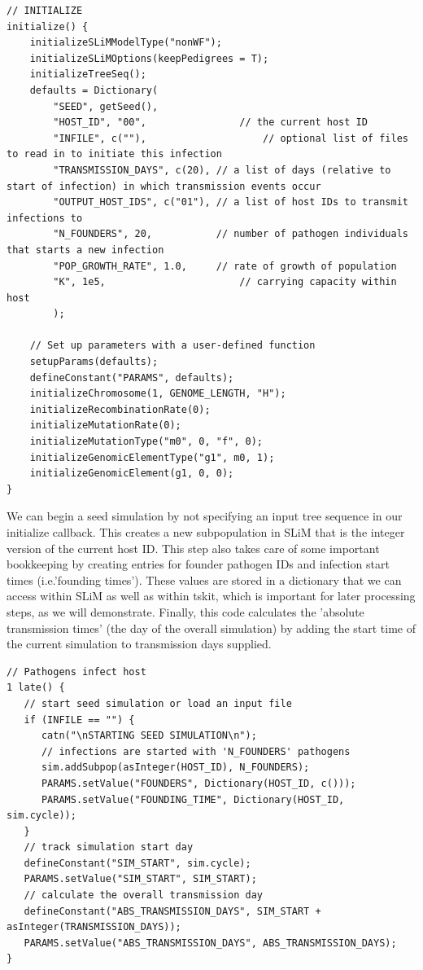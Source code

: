 \documentclass[12pt]{article}
\newcommand*{\ie}{i.e.\xcomma}
\begin{document}
\begin{verbatim}
// INITIALIZE
initialize() {
	initializeSLiMModelType("nonWF");
	initializeSLiMOptions(keepPedigrees = T);
	initializeTreeSeq();
	defaults = Dictionary(
		"SEED", getSeed(),
		"HOST_ID", "00", 				// the current host ID
		"INFILE", c(""),					// optional list of files to read in to initiate this infection
		"TRANSMISSION_DAYS", c(20),	// a list of days (relative to start of infection) in which transmission events occur
		"OUTPUT_HOST_IDS", c("01"),	// a list of host IDs to transmit infections to
		"N_FOUNDERS", 20,			// number of pathogen individuals that starts a new infection
		"POP_GROWTH_RATE", 1.0,		// rate of growth of population
		"K", 1e5,						// carrying capacity within host
		);
	
	// Set up parameters with a user-defined function
	setupParams(defaults);
	defineConstant("PARAMS", defaults);
	initializeChromosome(1, GENOME_LENGTH, "H");
	initializeRecombinationRate(0);
	initializeMutationRate(0);
	initializeMutationType("m0", 0, "f", 0);
	initializeGenomicElementType("g1", m0, 1);
	initializeGenomicElement(g1, 0, 0);
}
\end{verbatim}

We can begin a seed simulation by not specifying an input tree sequence in our initialize callback. This creates a new subpopulation in SLiM that is the integer version of the
current host ID. This step also takes care of some important bookkeeping by creating entries for founder pathogen IDs and infection start times (\ie 'founding times'). These
values are stored in a dictionary that we can access within SLiM as well as within tskit, which is important for later processing steps, as we will demonstrate. Finally, this code
calculates the 'absolute transmission times' (the day of the overall simulation) by adding the start time of the current simulation to transmission days supplied.

\begin{verbatim}
// Pathogens infect host
1 late() {
   // start seed simulation or load an input file
   if (INFILE == "") {
      catn("\nSTARTING SEED SIMULATION\n");
      // infections are started with 'N_FOUNDERS' pathogens
      sim.addSubpop(asInteger(HOST_ID), N_FOUNDERS);
      PARAMS.setValue("FOUNDERS", Dictionary(HOST_ID, c()));
      PARAMS.setValue("FOUNDING_TIME", Dictionary(HOST_ID, sim.cycle));
   }
   // track simulation start day
   defineConstant("SIM_START", sim.cycle);		
   PARAMS.setValue("SIM_START", SIM_START);
   // calculate the overall transmission day
   defineConstant("ABS_TRANSMISSION_DAYS", SIM_START + asInteger(TRANSMISSION_DAYS));
   PARAMS.setValue("ABS_TRANSMISSION_DAYS", ABS_TRANSMISSION_DAYS);
}
\end{verbatim}
\end{document}
